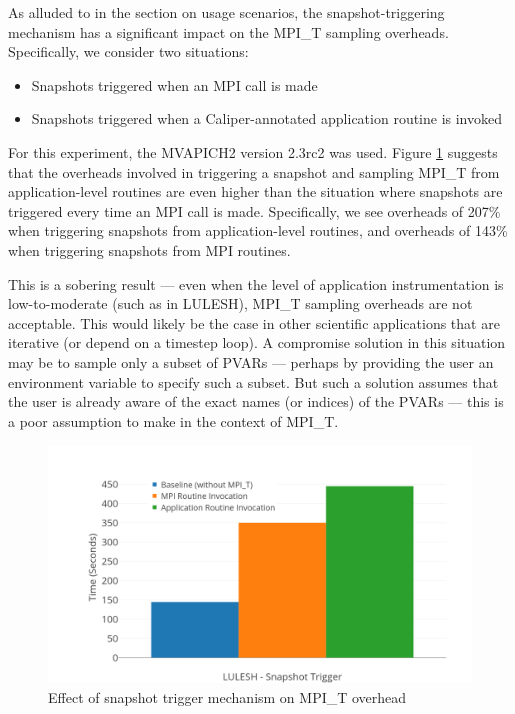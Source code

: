 \par As alluded to in the section on usage scenarios, the snapshot-triggering mechanism has a significant impact on the MPI\_T sampling overheads. Specifically, we consider two situations:
\begin{itemize}
\item Snapshots triggered when an MPI call is made
\item Snapshots triggered when a Caliper-annotated application routine is invoked
\end{itemize}
For this experiment, the MVAPICH2 version 2.3rc2 was used. Figure \ref{fig:cali-overhead-snapshot} suggests that the overheads involved in triggering a snapshot and sampling MPI\_T from application-level routines are even higher than the situation where snapshots are triggered every time an MPI call is made. Specifically, we see overheads of 207\% when triggering snapshots from application-level routines, and overheads of 143\% when triggering snapshots from MPI routines. 
\par This is a sobering result --- even when the level of application instrumentation is low-to-moderate (such as in LULESH), MPI\_T sampling overheads are not acceptable. This would likely be the case in other scientific applications that are iterative (or depend on a timestep loop). A compromise solution in this situation may be to sample only a subset of PVARs --- perhaps by providing the user an environment variable to specify such a subset. But such a solution assumes that the user is already aware of the exact names (or indices) of the PVARs --- this is a poor assumption to make in the context of MPI\_T.
\begin{center}
	\begin{figure}[bp!]
         \centering
  \captionsetup{justification=centering}
		\includegraphics[scale=0.8, width=\columnwidth, keepaspectratio]{figures/CALIPER_overheads_snapshot_trigger}
		\caption{Effect of snapshot trigger mechanism on MPI\_T overhead}
		\label{fig:cali-overhead-snapshot}
	\end{figure}
\end{center}

